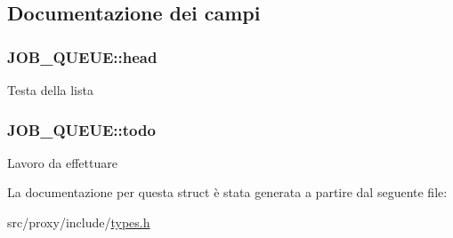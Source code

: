 \subsection{Documentazione dei campi}
\hypertarget{structJOB__QUEUE_a062357df307cecd98a9e1e7b05400d09}{
\subsubsection[{head}]{ {\bf JOB\_\-QUEUE::head}}}
\label{structJOB__QUEUE_a062357df307cecd98a9e1e7b05400d09}
Testa della lista \hypertarget{structJOB__QUEUE_a8b47ceebda88577d79dab26e02d65bde}{
\subsubsection[{todo}]{ {\bf JOB\_\-QUEUE::todo}}}
\label{structJOB__QUEUE_a8b47ceebda88577d79dab26e02d65bde}
Lavoro da effettuare 

La documentazione per questa struct è stata generata a partire dal seguente file:\begin{DoxyCompactItemize}
\item 
src/proxy/include/\hyperlink{types_8h}{types.h}\end{DoxyCompactItemize}
